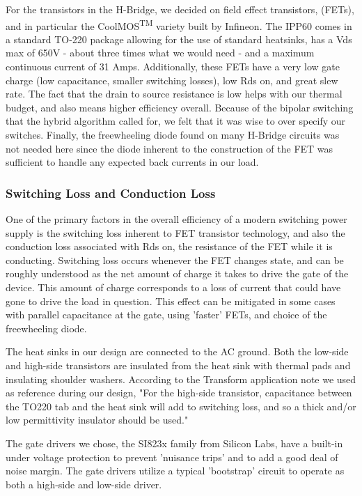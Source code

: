 For the transistors in the H-Bridge, we decided on field effect transistors, (FETs), and in particular the CoolMOS\textsuperscript{TM}
variety built by Infineon. The IPP60 comes in a standard TO-220 package allowing for the use of standard heatsinks, has a Vds max of 650V - about three times what we would need - and a maximum continuous current of 31 Amps. Additionally, these FETs have a very low gate charge (low capacitance, smaller switching losses), low Rds on, and great slew rate. The fact that the drain to source resistance is low helps with our thermal budget, and also means higher efficiency overall. Because of the bipolar switching that the hybrid algorithm called for, we felt that it was wise to over specify our switches. Finally, the freewheeling diode found on many H-Bridge circuits was not needed here since the diode inherent to the construction of the FET was sufficient to handle any expected back currents in our load. 

\subsubsection{Switching Loss and Conduction Loss}
One of the primary factors in the overall efficiency of a modern switching power supply is the switching loss inherent to FET transistor technology, and also the conduction loss associated with Rds on, the resistance of the FET while it is conducting. Switching loss occurs whenever the FET changes state, and can be roughly understood as the net amount of charge it takes to drive the gate of the device. This amount of charge corresponds to a loss of current that could have gone to drive the load in question. This effect can be mitigated in some cases with parallel capacitance at the gate, using 'faster' FETs, and choice of the freewheeling diode\cite{switchingLoss}.

The heat sinks in our design are connected to the AC ground. Both the low-side and high-side transistors are insulated from the heat sink with thermal pads and insulating shoulder washers. According to the Transform application note we used as reference during our design, "For the high-side transistor, capacitance between the TO220 tab and the heat sink will add to switching loss, and so a thick and/or low permittivity insulator should be used."\cite{transphorm}

The gate drivers we chose, the SI823x family from Silicon Labs, have a built-in under voltage protection to prevent 'nuisance trips' and to add a good deal of noise margin. The gate drivers utilize a typical 'bootstrap' circuit to operate as both a high-side and low-side driver. 

